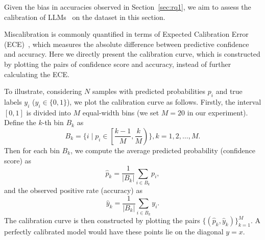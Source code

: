 Given the bias in accuracies observed in Section~\ref{sec:rq1}, we aim to assess the calibration of LLMs~\cite{guo2017calibration, minderer2021revisiting, xiao2022uncertainty} on the \mkj dataset in this section.

Miscalibration is commonly quantified in terms of Expected Calibration Error (ECE)~\cite{naeini2015obtaining}, which measures the absolute difference between predictive confidence and accuracy.
Here we directly present the calibration curve, which is constructed by plotting the pairs of confidence score and accuracy, instead of further calculating the ECE.

To illustrate, considering \(N\) samples with predicted probabilities \(p_i\) and true labels \(y_i\) (\(y_i \in \{0,1\}\)), we plot the calibration curve as follows. 
Firstly, the interval \([0,1]\) is divided into \(M\) equal-width bins (we set $M=20$ in our experiment). Define the \(k\)-th bin \(B_k\) as 
\begin{equation*}
B_k = \{ i \mid p_i \in \left[\frac{k-1}{M}, \frac{k}{M}\right) \}, k = 1, 2, \dots, M.
\end{equation*}
Then for each bin \(B_k\), we compute the average predicted probability (confidence score) as 
\begin{equation*}
\hat{p}_k = \frac{1}{|B_k|} \sum_{i \in B_k} p_i,
\end{equation*}
and the observed positive rate (accuracy) as 
\begin{equation*}
\hat{y}_k = \frac{1}{|B_k|} \sum_{i \in B_k} y_i.
\end{equation*}
The calibration curve is then constructed by plotting the pairs \(\{ (\hat{p}_k, \hat{y}_k) \}_{k=1}^{M}\). 
A perfectly calibrated model would have these points lie on the diagonal $y=x$.

